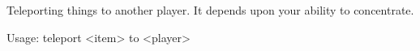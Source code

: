 Teleporting things to another player.
It depends upon your ability to concentrate.
  
Usage: teleport <item> to <player> 

 
